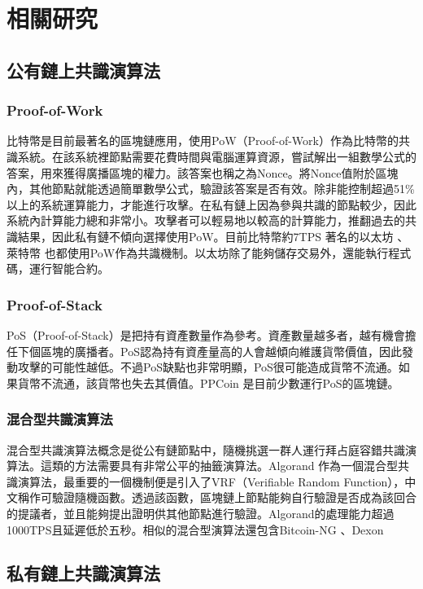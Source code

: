 \chapter{相關研究}\label{se_7}
\section{公有鏈上共識演算法}\label{se_7}
\subsection{Proof-of-Work}\label{se_7} 
比特幣是目前最著名的區塊鏈應用，使用PoW（Proof-of-Work）作為比特幣的共識系統。在該系統裡節點需要花費時間與電腦運算資源，嘗試解出一組數學公式的答案，用來獲得廣播區塊的權力。該答案也稱之為Nonce。將Nonce值附於區塊內，其他節點就能透過簡單數學公式，驗證該答案是否有效。除非能控制超過51\%以上的系統運算能力，才能進行攻擊。在私有鏈上因為參與共識的節點較少，因此系統內計算能力總和非常小。攻擊者可以輕易地以較高的計算能力，推翻過去的共識結果，因此私有鏈不傾向選擇使用PoW。目前比特幣約7TPS \cite{BitcoinThroughput}
著名的以太坊 \cite{Ethereum}、萊特幣 \cite{Litecoin}也都使用PoW作為共識機制。以太坊除了能夠儲存交易外，還能執行程式碼，運行智能合約。
\subsection{Proof-of-Stack}\label{se_7}
PoS（Proof-of-Stack）是把持有資產數量作為參考。資產數量越多者，越有機會擔任下個區塊的廣播者。PoS認為持有資產量高的人會越傾向維護貨幣價值，因此發動攻擊的可能性越低。不過PoS缺點也非常明顯，PoS很可能造成貨幣不流通。如果貨幣不流通，該貨幣也失去其價值。PPCoin \cite{vasin2014blackcoin}是目前少數運行PoS的區塊鏈。
\subsection{混合型共識演算法}\label{se_7}
混合型共識演算法概念是從公有鏈節點中，隨機挑選一群人運行拜占庭容錯共識演算法。這類的方法需要具有非常公平的抽籤演算法。Algorand \cite{gilad2017algorand}作為一個混合型共識演算法，最重要的一個機制便是引入了VRF（Verifiable Random Function），中文稱作可驗證隨機函數。透過該函數，區塊鏈上節點能夠自行驗證是否成為該回合的提議者，並且能夠提出證明供其他節點進行驗證。Algorand的處理能力超過1000TPS且延遲低於五秒。相似的混合型演算法還包含Bitcoin-NG \cite{eyal2016bitcoin}、Dexon \cite{dexon}


\section{私有鏈上共識演算法}\label{se_7}
